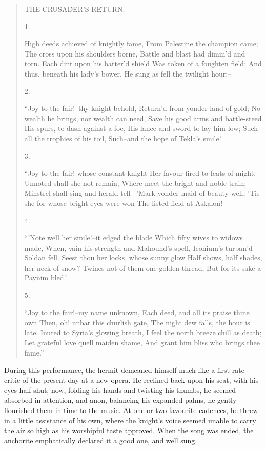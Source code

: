 \begin{quote}
THE CRUSADER'S RETURN.

1.

High deeds achieved of knightly fame,
From Palestine the champion came;
The cross upon his shoulders borne,
Battle and blast had dimm'd and torn.
Each dint upon his batter'd shield
Was token of a foughten field;
And thus, beneath his lady's bower,
He sung as fell the twilight hour:--

2.

``Joy to the fair!--thy knight behold,
Return'd from yonder land of gold;
No wealth he brings, nor wealth can need,
Save his good arms and battle-steed
His spurs, to dash against a foe,
His lance and sword to lay him low;
Such all the trophies of his toil,
Such--and the hope of Tekla's smile!

3.

``Joy to the fair! whose constant knight
Her favour fired to feats of might;
Unnoted shall she not remain,
Where meet the bright and noble train;
Minstrel shall sing and herald tell--
'Mark yonder maid of beauty well,
'Tis she for whose bright eyes were won
The listed field at Askalon!

4.

``'Note well her smile!--it edged the blade
Which fifty wives to widows made,
When, vain his strength and Mahound's spell,
Iconium's turban'd Soldan fell.
Seest thou her locks, whose sunny glow
Half shows, half shades, her neck of snow?
Twines not of them one golden thread,
But for its sake a Paynim bled.'

5.

``Joy to the fair!--my name unknown,
Each deed, and all its praise thine own
Then, oh! unbar this churlish gate,
The night dew falls, the hour is late.
Inured to Syria's glowing breath,
I feel the north breeze chill as death;
Let grateful love quell maiden shame,
And grant him bliss who brings thee fame.''
\end{quote}

During this performance, the hermit demeaned himself much like a
first-rate critic of the present day at a new opera. He reclined back
upon his seat, with his eyes half shut; now, folding his hands and
twisting his thumbs, he seemed absorbed in attention, and anon,
balancing his expanded palms, he gently flourished them in time to the
music. At one or two favourite cadences, he threw in a little assistance
of his own, where the knight's voice seemed unable to carry the air so
high as his worshipful taste approved. When the song was ended, the
anchorite emphatically declared it a good one, and well sung.

